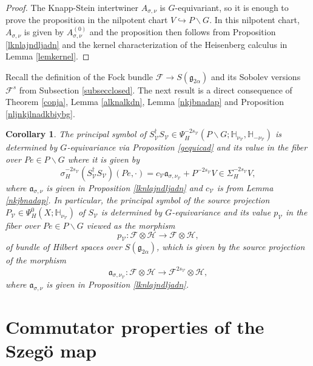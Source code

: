 \documentclass[a4paper,reqno]{amsart}
\numberwithin{equation}{section}
\newtheorem{cor}[thm]{Corollary}
\theoremstyle{definition}
\theoremstyle{remark}
\begin{document}
\begin{proof}
The Knapp-Stein intertwiner $A_{\sigma,\nu}$ is $G$-equivariant, so it is enough to prove the proposition in the nilpotent chart $V\hookrightarrow P\backslash G$. In this nilpotent chart, $A_{\sigma,\nu}$ is given by $A_{\sigma,\nu}^{(0)}$ and the proposition then follows from Proposition \ref{lknlajndljadn} and the kernel characterization of the Heisenberg calculus in Lemma \ref{lemkernel}.
\end{proof}

Recall the definition of the Fock bundle $\mathcal{F}\to S(\mathfrak{g}_{2\alpha})$ and its Sobolev versions $\mathcal{F}^s$ from Subsection \ref{subsecclosed}. The next result is a direct consequence of Theorem \ref{conja}, Lemma \ref{alknalkdn}, Lemma \ref{nkjbnadap} and Proposition \ref{nljnkjlnadkbiybg}.

\begin{cor}
\label{blablaks}
The principal symbol of $S_{\mathcal{V}}^\dagger S_{\mathcal{V}}\in \Psi^{-2s_\mathcal{V}}_H(P\backslash G; \mathbb{H}_{\nu_{\mathcal{V}}},\mathbb{H}_{-\nu_{\mathcal{V}}})$ is determined by $G$-equivariance via Proposition \ref{gequicad} and its value in the fiber over $Pe\in P\backslash G$ where it is given by 
$$\sigma_H^{-2s_\mathcal{V}}(S_{\mathcal{V}}^\dagger S_{\mathcal{V}})(Pe,\cdot)=c_{\mathcal{V}}\mathfrak{a}_{\sigma,\nu_{\mathcal{V}}}+P^{-2s_\mathcal{V}}V\in \Sigma_H^{-2s_{\mathcal{V}}}V,$$
where $\mathfrak{a}_{\sigma,\nu}$ is given in Proposition \ref{lknlajndljadn} and $c_{\mathcal{V}}$ is from Lemma \ref{nkjbnadap}. In particular, the principal symbol of the source projection $P_{\mathcal{V}}\in \Psi^0_H(X;\mathbb{H}_{\nu_{\mathcal{V}}})$ of $S_{\mathcal{V}}$ is determined by $G$-equivariance and its value $p_{\mathcal{V}}$ in the fiber over $Pe\in P\backslash G$ viewed as the morphism 
$$p_{\mathcal{V}}:\mathcal{F}\otimes \mathcal{H}\to \mathcal{F}\otimes \mathcal{H},$$
of bundle of Hilbert spaces over $S(\mathfrak{g}_{2\alpha})$, which is given by the source projection of the morphism
$$\mathfrak{a}_{\sigma,\nu_{\mathcal{V}}}:\mathcal{F}\otimes \mathcal{H}\to \mathcal{F}^{2s_\mathcal{V}}\otimes \mathcal{H},$$
where $\mathfrak{a}_{\sigma,\nu}$ is given in Proposition \ref{lknlajndljadn}.
\end{cor}



\section{Commutator properties of the Szegö map}
\label{commsec}
\end{document}
